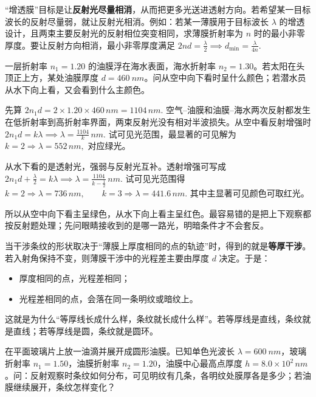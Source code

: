 \begin{definition}[增透膜与增反膜]
    “增透膜”目标是让\textbf{反射光尽量相消}，从而把更多光送进透射方向。若希望某一目标波长的反射尽量弱，就让反射光相消。例如：若某一薄膜用于目标波长 \(\lambda\) 的增透设计，且两束主要反射光的反射相位突变相同，求薄膜折射率为 \(n\) 时的最小非零厚度。要让反射方向相消，最小非零厚度满足 \(2nd=\frac{\lambda}{2}\implies d_{\min}=\frac{\lambda}{4n}.\) 
\end{definition}


\begin{exercise}[油膜上下观察时为什么会看到不同颜色]
一层折射率 \(n_1=1.20\) 的油膜浮在海水表面，海水折射率 \(n_2=1.30\)。若太阳在头顶正上方，某处油膜厚度 \(d=\SI{460}{nm}\)。问从空中向下看时呈什么颜色；若潜水员从水下向上看，又会看到什么主颜色。
\end{exercise}
\begin{solution}
先算
 \(2n_1d=2\times1.20\times460\,\si{nm}=1104\,\si{nm}.\) 
空气--油膜和油膜--海水两次反射都发生在低折射率到高折射率界面，两束反射光没有相对半波损失。从空中看反射增强时
 \(2n_1d=k\lambda \implies \lambda=\frac{1104}{k}\,\si{nm}.\) 
试可见光范围，最显著的可见解为
 \(k=2\Rightarrow \lambda=552\,\si{nm},\) 
对应绿光。

从水下看的是透射光，强弱与反射光互补。透射增强可写成
 \(2n_1d+\frac{\lambda}{2}=k\lambda \implies \lambda=\frac{1104}{k-\frac12}\,\si{nm}.\) 
试可见光范围得
 \(k=2\Rightarrow \lambda=736\,\si{nm},\qquad k=3\Rightarrow \lambda=441.6\,\si{nm}.\) 
其中主显著可见颜色可取红光。

所以从空中向下看主呈绿色，从水下向上看主呈红色。最容易错的是把上下观察都按反射题处理；先问眼睛接收到的是哪一路光，明暗条件才不会套反。
\end{solution}

\begin{definition}[等厚干涉]
当干涉条纹的形状取决于“薄膜上厚度相同的点的轨迹”时，得到的就是\textbf{等厚干涉}。
若入射角保持不变，则薄膜干涉中的光程差主要由厚度 \(d\) 决定。于是：
\begin{itemize}
 \item 厚度相同的点，光程差相同；
 \item 光程差相同的点，会落在同一条明纹或暗纹上。
\end{itemize}
这就是为什么“等厚线长成什么样，条纹就长成什么样”。若等厚线是直线，条纹就是直线；若等厚线是圆，条纹就是圆环。
\end{definition}

\begin{exercise}[圆形油膜条纹为什么会一圈圈向中心数]
在平面玻璃片上放一油滴并展开成圆形油膜。已知单色光波长 \(\lambda=\SI{600}{nm}\)，玻璃折射率 \(n_1=1.50\)，油膜折射率 \(n_2=1.20\)，油膜中心最高点厚度 \(h=8.0\times10^2\,\si{nm}\)。问：反射观察时条纹如何分布，可见明纹有几条，各明纹处膜厚各是多少；若油膜继续展开，条纹怎样变化？
\end{exercise}

